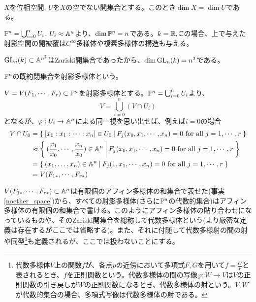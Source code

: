 \documentclass{ltjsreport}
\begin{document}
\begin{fact}[\cite{RH}]\label{dim_property}
  $X$を位相空間, $U$を$X$の空でない開集合とする。このとき$\dim X=\dim U$である。
\end{fact}


\begin{eg}
  $\mathbb{P}^n=\bigcup_{i=0}^nU_i$, $U_i\approx \mathbb{A}^n$より、$\dim\mathbb{P}^n=n$である。$k=\mathbb{R},\mathbb{C}$の場合、上で与えた射影空間の開被覆は$C^\infty$多様体や複素多様体の構造も与える。
\end{eg}

\begin{eg}
  $\text{GL}_n(k)\subset\mathbb{A}^{n^2}$はZariski開集合であったから、$\dim\text{GL}_n(k)=n^2$である。
\end{eg}


\begin{defin}
  $\mathbb{P}^n$の既約閉集合を射影多様体という。
\end{defin}

$V=V(F_1,\cdots,F_r)\subset\mathbb{P}^n$を射影多様体とする。$\mathbb{P}^n=\bigcup_{i=0}^nU_i$より、
\[
V=\bigcup_{i=0}^n(V\cap U_i)
\]
となるが、$\varphi:U_i\rightarrow \mathbb{A}^n$による同一視を思い出せば、例えば$i=0$の場合
\begin{align*}
V\cap U_0
&=\left\{\:[x_0:x_1:\cdots:x_n]\in U_0\:\middle|\:F_j(x_0,x_1,\cdots,x_n)=0\text{ for all $j=1,\cdots,r$}\:\right\}\\
&\approx \left\{\:(\frac{x_1}{x_0},\cdots,\frac{x_n}{x_0})\in\mathbb{A}^n\:\middle|\:F_j(x_0,x_1,\cdots,x_n)=0\text{ for all $j=1,\cdots,r$}\:\right\}\\
&=\left\{\:(x_1,\dots,x_n)\in\mathbb{A}^n\:\middle|\:F_j(1,x_1,\cdots,x_n)=0\text{ for all $j=1,\cdots,r$}\:\right\}\\
&=V(F_{1*},\cdots,F_{r*})
\end{align*}

$V(F_{1*},\cdots,F_{r*})\subset\mathbb{A}^n$は有限個のアフィン多様体の和集合で表せた(事実\ref{noether_space})から、すべての射影多様体(さらに$\mathbb{P}^n$の代数的集合)はアフィン多様体の有限個の和集合で書ける。このようにアフィン多様体の貼り合わせになっているものや、そのZariski開集合を総称して代数多様体という(より厳密な定義は存在するがここでは省略する)。また、それに付随して代数多様射の間の射や同型\footnote{
  代数多様体$V$上の関数$f$が、各点$p$の近傍において多項式$F,G$を用いて$f=\frac{G}{F}$と表されるとき、$f$を正則関数という。代数多様体の間の写像$\varphi:W\rightarrow V$は$V$の正則関数の引き戻しが$W$の正則関数になるとき、代数多様体の射という。$V,W$が代数的集合の場合、多項式写像は代数多様体の射である。
}も定義されるが、ここでは扱わないことにする。
\end{document}
